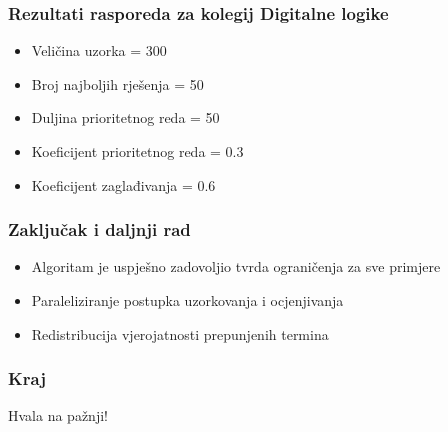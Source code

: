 \documentclass{beamer}
\begin{document}
\begin{frame}
  \frametitle{Rezultati rasporeda za kolegij Digitalne logike}
  \begin{itemize}
    \item Veličina uzorka = 300
    \item Broj najboljih rješenja = 50
    \item Duljina prioritetnog reda = 50
    \item Koeficijent prioritetnog reda = 0.3
    \item Koeficijent zaglađivanja = 0.6
  \end{itemize}

  \begin{table}
    \caption{Rezultati rasporeda za kolegij Digitalne logike}
    \label{tbl:diglog_300}
    \centering
  \end{table}
\end{frame}



\begin{frame}
  \frametitle{Zaključak i daljnji rad}
  \begin{itemize}
    \item Algoritam je uspješno zadovoljio tvrda ograničenja za sve primjere
    \item Paraleliziranje postupka uzorkovanja i ocjenjivanja
    \item Redistribucija vjerojatnosti prepunjenih termina
  \end{itemize}
\end{frame}

\begin{frame}
  \frametitle{Kraj}
  \centering
  \large
    Hvala na pažnji!
\end{frame}
\end{document}
